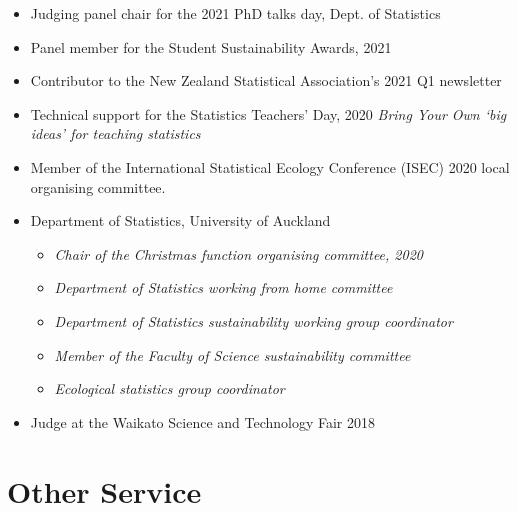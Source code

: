 \documentclass[10pt,a4paper]{moderncv}
\begin{document}
\begin{itemize}
  \item Judging panel chair for the 2021 PhD talks day, Dept. of Statistics
  \item Panel member for the Student Sustainability Awards, 2021
  \item Contributor to the New Zealand Statistical Association's 2021 Q1 newsletter
  \item Technical support for the Statistics Teachers' Day, 2020 \textit{Bring Your Own `big ideas' for teaching statistics}
\item Member of the International Statistical Ecology Conference (ISEC) 2020 local organising committee.
\item Department of Statistics, University of Auckland
  \begin{itemize}
  \item \textit{Chair of the Christmas function organising committee, 2020}
  \item \textit{Department of Statistics working from home committee}
  \item \textit{Department of Statistics sustainability working group coordinator}
  \item \textit{Member of the Faculty of Science sustainability committee}
  \item \textit{Ecological statistics group coordinator}
  \end{itemize}
\item Judge at the Waikato Science and Technology Fair 2018
\end{itemize}



\section{Other Service}

\vspace{6pt}
\end{document}
